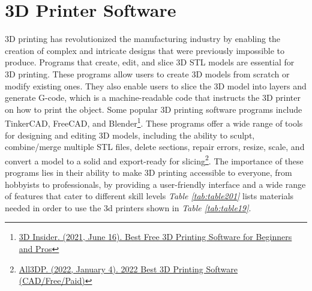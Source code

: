 \hypertarget{d-printer-materials-program}{}\section{3D Printer Software}\label{d-printer-materials-program}
3D printing has revolutionized the manufacturing industry by enabling the creation of complex and intricate designs that were previously impossible to produce. Programs that create, edit, and slice 3D STL models are essential for 3D printing. These programs allow users to create 3D models from scratch or modify existing ones. They also enable users to slice the 3D model into layers and generate G-code, which is a machine-readable code that instructs the 3D printer on how to print the object. Some popular 3D printing software programs include TinkerCAD, FreeCAD, and Blender\footnote{\raggedright \href{https://3dinsider.com/free-3d-printing-software/}{3D Insider. (2021, June 16). Best Free 3D Printing Software for Beginners and Pros}}. These programs offer a wide range of tools for designing and editing 3D models, including the ability to sculpt, combine/merge multiple STL files, delete sections, repair errors, resize, scale, and convert a model to a solid and export-ready for slicing\footnote{\raggedright \href{https://all3dp.com/1/best-3d-printing-software-tools/}{All3DP. (2022, January 4). 2022 Best 3D Printing Software (CAD/Free/Paid)}}. The importance of these programs lies in their ability to make 3D printing accessible to everyone, from hobbyists to professionals, by providing a user-friendly interface and a wide range of features that cater to different skill levels
\textit{Table \ref{tab:table201}} lists materials needed in order to use the 3d printers shown in \textit{Table \ref{tab:table19}}.

